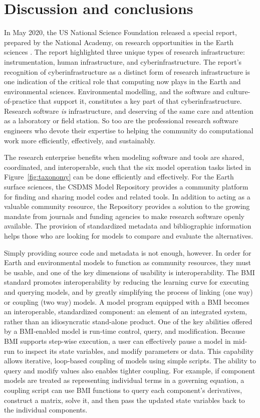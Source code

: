 \documentclass[journal abbreviation, manuscript]{copernicus}
\begin{document}
\section{Discussion and conclusions}
\label{sec:discussion}

In May 2020, the US National Science Foundation released a special report, prepared by the National Academy, on research opportunities in the Earth sciences \citep{nrc2020earth}. The report highlighted three unique types of research infrastructure: instrumentation, human infrastructure, and cyberinfrastructure. The report's recognition of cyberinfrastructure as a distinct form of research infrastructure is one indication of the critical role that computing now plays in the Earth and environmental sciences. Environmental modelling, and the software and culture-of-practice that support it, constitutes a key part of that cyberinfrastructure. Research software \textit{is} infrastructure, and deserving of the same care and attention as a laboratory or field station. So too are the professional research software engineers who devote their expertise to helping the community do computational work more efficiently, effectively, and sustainably.

The research enterprise benefits when modeling  software and tools are shared, coordinated, and interoperable, such that the six model operation tasks listed in Figure~\ref{fig:taxonomy} can be done efficiently and effectively. For the Earth surface sciences, the CSDMS Model Repository provides a community platform for finding and sharing model codes and related tools. In addition to acting as a valuable community resource, the Repository provides a solution to the growing mandate from journals and funding agencies to make research software openly available. The provision of standardized metadata and bibliographic information helps those who are looking for models to compare and evaluate the alternatives.

Simply providing source code and metadata is not enough, however. In order for Earth and environmental models to function as community resources, they must be usable, and one of the key dimensions of usability is interoperability. The BMI standard promotes interoperability by reducing the learning curve for executing and querying models, and by greatly simplifying the process of linking (one way) or coupling (two way) models. A model program equipped with a BMI becomes an interoperable, standardized component: an element of an integrated system, rather than an idiosyncratic stand-alone product. One of the key abilities offered by a BMI-enabled model is run-time control, query, and modification. Because BMI supports step-wise execution, a user can effectively pause a model in mid-run to inspect its state variables, and modify parameters or data. This capability allows iterative, loop-based coupling of models using simple scripts. The ability to query and modify values also enables tighter coupling. For example, if  component models are treated as representing individual terms in a governing equation, a coupling script can use BMI functions to query each component's derivatives, construct a matrix, solve it, and then pass the updated state variables back to the individual components.
\end{document}
